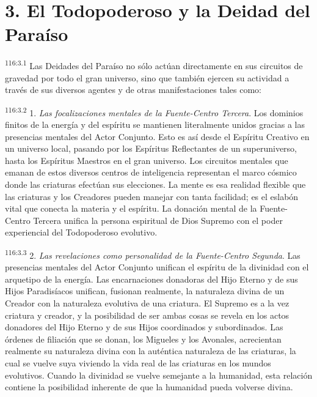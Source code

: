 \documentclass[twoside, 11pt]{book}
\begin{document}
\section*{3. El Todopoderoso y la Deidad del Paraíso}
\par
\textsuperscript{116:3.1} Las Deidades del Paraíso no sólo actúan directamente en sus circuitos de gravedad por todo el gran universo, sino que también ejercen su actividad a través de sus diversos agentes y de otras manifestaciones tales como:

\par
\textsuperscript{116:3.2} 1. \textit{Las focalizaciones mentales de la Fuente-Centro Tercera}. Los dominios finitos de la energía y del espíritu se mantienen literalmente unidos gracias a las presencias mentales del Actor Conjunto. Esto es así desde el Espíritu Creativo en un universo local, pasando por los Espíritus Reflectantes de un superuniverso, hasta los Espíritus Maestros en el gran universo. Los circuitos mentales que emanan de estos diversos centros de inteligencia representan el marco cósmico donde las criaturas efectúan sus elecciones. La mente es esa realidad flexible que las criaturas y los Creadores pueden manejar con tanta facilidad; es el eslabón vital que conecta la materia y el espíritu. La donación mental de la Fuente-Centro Tercera unifica la persona espiritual de Dios Supremo con el poder experiencial del Todopoderoso evolutivo.

\par
\textsuperscript{116:3.3} 2. \textit{Las revelaciones como personalidad de la Fuente-Centro Segunda}. Las presencias mentales del Actor Conjunto unifican el espíritu de la divinidad con el arquetipo de la energía. Las encarnaciones donadoras del Hijo Eterno y de sus Hijos Paradisíacos unifican, fusionan realmente, la naturaleza divina de un Creador con la naturaleza evolutiva de una criatura. El Supremo es a la vez criatura y creador, y la posibilidad de ser ambas cosas se revela en los actos donadores del Hijo Eterno y de sus Hijos coordinados y subordinados. Las órdenes de filiación que se donan, los Migueles y los Avonales, acrecientan realmente su naturaleza divina con la auténtica naturaleza de las criaturas, la cual se vuelve suya viviendo la vida real de las criaturas en los mundos evolutivos. Cuando la divinidad se vuelve semejante a la humanidad, esta relación contiene la posibilidad inherente de que la humanidad pueda volverse divina.
\end{document}
